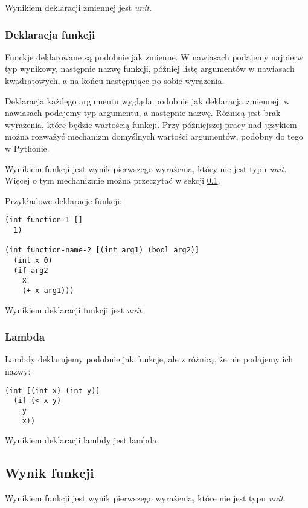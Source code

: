 \documentclass{article}
\begin{document}
Wynikiem deklaracji zmiennej jest \textit{unit}.

\subsubsection{Deklaracja funkcji}\label{func:decl}

Funckje deklarowane są podobnie jak zmienne. W nawiasach podajemy najpierw typ wynikowy, następnie nazwę funkcji, później listę argumentów w nawiasach kwadratowych, a na końcu następujące po sobie wyrażenia.

Deklaracja każdego argumentu wygląda podobnie jak deklaracja zmiennej: w nawiasach podajemy typ argumentu, a następnie nazwę. Różnicą jest brak wyrażenia, które będzie wartością funkcji. Przy późniejszej pracy nad językiem można rozważyć mechanizm domyślnych wartości argumentów, podobny do tego w Pythonie.

Wynikiem funkcji jest wynik pierwszego wyrażenia, który nie jest typu \textit{unit}. Więcej o tym mechanizmie można przeczytać w sekcji \ref{func:result}.

Przykładowe deklaracje funkcji:

\begin{lstlisting}
(int function-1 []
  1)

(int function-name-2 [(int arg1) (bool arg2)]
  (int x 0)
  (if arg2
    x
    (+ x arg1)))
\end{lstlisting}

Wynikiem deklaracji funkcji jest \textit{unit}.

\subsubsection{Lambda}

Lambdy deklarujemy podobnie jak funkcje, ale z różnicą, że nie podajemy ich nazwy:

\begin{lstlisting}
(int [(int x) (int y)]
  (if (< x y)
    y
    x))
\end{lstlisting}

Wynikiem deklaracji lambdy jest lambda.

\subsection{Wynik funkcji}\label{func:result}

Wynikiem funkcji jest wynik pierwszego wyrażenia, które nie jest typu \textit{unit}.
\end{document}

